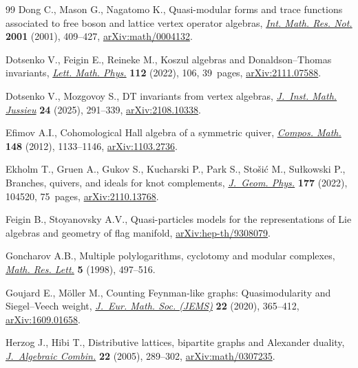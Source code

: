\documentclass[pdftex]{sigma}
\numberwithin{equation}{section}
\theoremstyle{definition}
\begin{document}
\begin{thebibliography}{99}
Dong C., Mason G., Nagatomo K., Quasi-modular forms and trace functions
 associated to free boson and lattice vertex operator algebras,
 \href{https://doi.org/10.1155/S1073792801000204}{\textit{Int. Math. Res.
 Not.}} \textbf{2001} (2001), 409--427,
 \href{https://arxiv.org/abs/math/0004132}{arXiv:math/0004132}.

Dotsenko V., Feigin E., Reineke M., Koszul algebras and {D}onaldson--{T}homas
 invariants, \href{https://doi.org/10.1007/s11005-022-01604-4}{\textit{Lett.
 Math. Phys.}} \textbf{112} (2022), 106, 39~pages,
 \href{https://arxiv.org/abs/2111.07588}{arXiv:2111.07588}.

Dotsenko V., Mozgovoy S., D{T} invariants from vertex algebras,
 \href{https://doi.org/10.1017/S1474748024000288}{\textit{J.~Inst. Math.
 Jussieu}} \textbf{24} (2025), 291--339,
 \href{https://arxiv.org/abs/2108.10338}{arXiv:2108.10338}.

Efimov A.I., Cohomological {H}all algebra of a symmetric quiver,
 \href{https://doi.org/10.1112/S0010437X12000152}{\textit{Compos. Math.}}
 \textbf{148} (2012), 1133--1146,
 \href{https://arxiv.org/abs/1103.2736}{arXiv:1103.2736}.

Ekholm T., Gruen A., Gukov S., Kucharski P., Park S., Sto\v{s}i\'{c} M.,
 Su{\l}kowski P., Branches, quivers, and ideals for knot complements,
 \href{https://doi.org/10.1016/j.geomphys.2022.104520}{\textit{J.~Geom.
 Phys.}} \textbf{177} (2022), 104520, 75~pages,
 \href{https://arxiv.org/abs/2110.13768}{arXiv:2110.13768}.

Feigin B., Stoyanovsky A.V., Quasi-particles models for the representations of
 {L}ie algebras and geometry of flag manifold,
 \href{https://arxiv.org/abs/hep-th/9308079}{arXiv:hep-th/9308079}.

Goncharov A.B., Multiple polylogarithms, cyclotomy and modular complexes,
 \href{https://doi.org/10.4310/MRL.1998.v5.n4.a7}{\textit{Math. Res. Lett.}}
 \textbf{5} (1998), 497--516.

Goujard E., M\"{o}ller M., Counting {F}eynman-like graphs: {Q}uasimodularity
 and {S}iegel--{V}eech weight,
 \href{https://doi.org/10.4171/jems/924}{\textit{J.~Eur. Math. Soc. (JEMS)}}
 \textbf{22} (2020), 365--412,
 \href{https://arxiv.org/abs/1609.01658}{arXiv:1609.01658}.

Herzog J., Hibi T., Distributive lattices, bipartite graphs and {A}lexander
 duality,
 \href{https://doi.org/10.1007/s10801-005-4528-1}{\textit{J.~Algebraic
 Combin.}} \textbf{22} (2005), 289--302,
 \href{https://arxiv.org/abs/math/0307235}{arXiv:math/0307235}.


\end{thebibliography}
\end{document}
